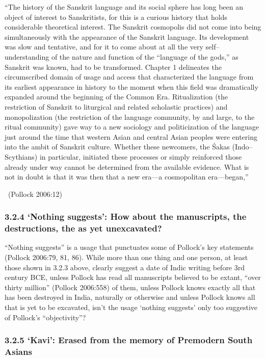 \begin{myquote}
“The history of the Sanskrit language and its social sphere has long been an object of interest to Sanskritists, for this is a curious history that holds considerable theoretical interest. The Sanskrit cosmopolis did not come into being simultaneously with the appearance of the Sanskrit language. Its development was slow and tentative, and for it to come about at all the very self–understanding of the nature and function of the “language of the gods,” as Sanskrit was known, had to be transformed. Chapter 1 delineates the circumscribed domain of usage and access that characterized the language from its earliest appearance in history to the moment when this field was dramatically expanded around the beginning of the Common Era. Ritualization (the restriction of Sanskrit to liturgical and related scholastic practices) and monopolization (the restriction of the language community, by and large, to the ritual community) gave way to a new sociology and politicization of the language just around the time that western Asian and central Asian peoples were entering into the ambit of Sanskrit culture. Whether these newcomers, the Śakas (Indo–Scythians) in particular, initiated these processes or simply reinforced those already under way cannot be determined from the available evidence. What is not in doubt is that it was then that a new era—a cosmopolitan era—began,” 

~\hfill (Pollock 2006:12)
\end{myquote}


\subsubsection*{3.2.4 ‘Nothing suggests’: How about the manuscripts, the destructions, the as yet unexcavated?}

“Nothing suggests” is a usage that punctuates some of Pollock’s key statements (Pollock 2006:79, 81, 86). While more than one thing and one person, at least those shown in 3.2.3 above, clearly suggest a date of Indic writing before 3rd century BCE, unless Pollock has read all manuscripts believed to be extant, “over thirty million” (Pollock 2006:558) of them, unless Pollock knows exactly all that has been destroyed in India, naturally or otherwise and unless Pollock knows all that is yet to be excavated, isn’t the usage ‘nothing suggests’ only too suggestive of Pollock’s “objectivity”?


\subsubsection*{3.2.5 ‘Kavi’: Erased from the memory of Premodern South Asians}

